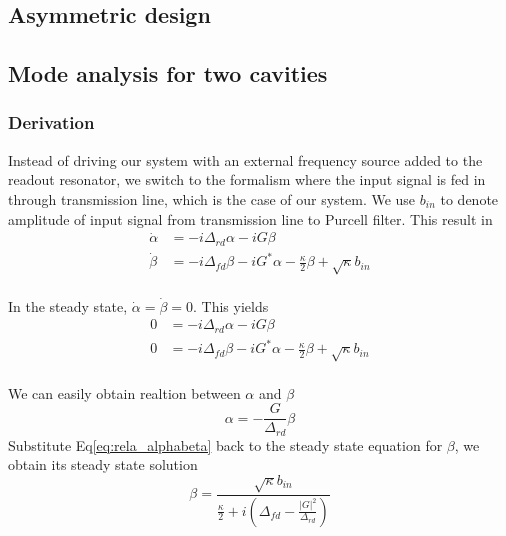 \subsection{Asymmetric design}
\subsection{Mode analysis for two cavities}

\subsubsection{Derivation}

Instead of driving our system with an external frequency source added to the readout resonator, we switch to the formalism where the input signal is fed in through transmission line, which is the case of our system. We use $b_{in}$ to denote amplitude of input signal from transmission line to Purcell filter. This result in
\\
\begin{equation} \begin{split}
	\dot \alpha &= - i \Delta_{rd} \alpha - i G \beta \\
	\dot \beta &= -i \Delta_{fd} \beta - i G^* \alpha - \frac{\kappa}{2} \beta + \sqrt{\kappa} b_{in}
\end{split} \end{equation}
\\
In the steady state, $\dot \alpha = \dot \beta = 0$. This yields
\\
\begin{equation} \begin{split}
	0 &= - i \Delta_{rd} \alpha - i G \beta \\
	0 &= -i \Delta_{fd} \beta - i G^* \alpha - \frac{\kappa}{2} \beta + \sqrt{\kappa} b_{in}
\end{split} \end{equation}
\\
We can easily obtain realtion between $\alpha$ and $\beta$
\\
\begin{equation}
	\alpha = -\frac{G}{\Delta_{rd}} \beta
	\label{eq:rela_alphabeta}
\end{equation}
Substitute Eq\ref{eq:rela_alphabeta} back to the steady state equation for $\beta$, we obtain its steady state solution
\\
\begin{equation}
	\beta = \frac{\sqrt{\kappa}b_{in}}{\frac{\kappa}{2} + i (\Delta_{fd} - \frac{|G|^2}{\Delta_{rd}})}
	\label{eq:steadyStateBeta}
\end{equation}
